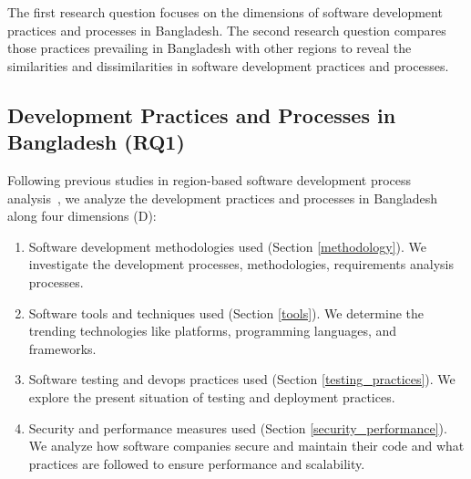 The first research question focuses on the dimensions of software development
practices and processes in Bangladesh. The second research question compares those
practices prevailing in Bangladesh with other regions to reveal the similarities
and dissimilarities in software development practices and processes.

\subsection{Development Practices and Processes in Bangladesh (RQ1)}
\label{RQ1}
Following previous studies in region-based software development process analysis~\citep{Garousi2013, Garousi2015, Vonken2012, Wang2018}, we 
analyze the development practices and processes in Bangladesh along four dimensions (D):
\begin{enumerate}[label=D\arabic{*}., leftmargin=20pt]
  \item Software development methodologies used (Section \ref{methodology}). We investigate the development
processes, methodologies, requirements analysis processes.
  \item Software tools and techniques used (Section \ref{tools}). We determine the
trending technologies like platforms, programming languages, and frameworks.
\item Software testing and devops practices used (Section \ref{testing_practices}). We explore the
present situation of testing and deployment practices.
\item Security and performance measures used (Section \ref{security_performance}). We analyze how
software companies secure and maintain their code and what practices are
followed to ensure performance and scalability.
\end{enumerate}






